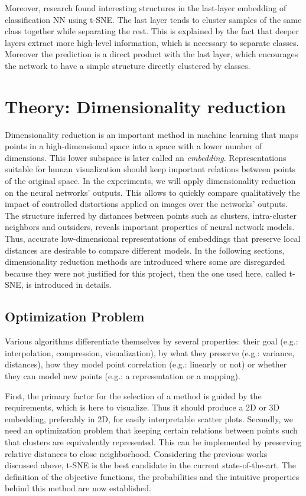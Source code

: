 \documentclass[a4paper,12pt]{report}
\newcommand{\eg}{e.g.}
\begin{document}
Moreover, research found interesting structures in the last-layer embedding of classification NN using t-SNE.
The last layer tends to cluster samples of the same class together while separating the rest\cite{donahue2013decaf}\cite{yu2014visualizing}.
This is explained by the fact that deeper layers extract more high-level information, which is necessary to separate classes. Moreover the prediction is a direct product with the last layer, which encourages the network to have a simple structure directly clustered by classes.


\chapter{Theory: Dimensionality reduction}
\label{chap:dim_red}
Dimensionality reduction is an important method in machine learning that maps points in a high-dimensional space into a space with a lower number of dimensions.
This lower subspace is later called an {\em embedding}.
Representations suitable for human visualization should keep important relations between points of the original space.
In the experiments, we will apply dimensionality reduction on the neural networks' outputs.
This allows to quickly compare qualitatively the impact of controlled distortions applied on images over the networks' outputs.
The structure inferred by distances between points such as clusters, intra-cluster neighbors and outsiders, reveals important properties of neural network models.
Thus, accurate low-dimensional representations of embeddings that preserve local distances are desirable to compare different models.
In the following sections, dimensionality reduction methods are introduced where some are disregarded because they were not justified for this project, then the one used here, called t-SNE, is introduced in details.

\section{Optimization Problem}
Various algorithms differentiate themselves by several properties: their goal (\eg: interpolation, compression, visualization), by what they preserve (\eg: variance, distances), how they model point correlation (\eg: linearly or not) or whether they can model new points (\eg: a representation or a mapping).

First, the primary factor for the selection of a method is guided by the requirements, which is here to visualize.
Thus it should produce a 2D or 3D embedding, preferably in 2D, for easily interpretable scatter plots.
Secondly, we need an optimization problem that keeping certain relations between points such that clusters are equivalently represented.
This can be implemented by preserving relative distances to close neighborhood.
Considering the previous works discussed above, t-SNE is the best candidate in the current state-of-the-art.
The definition of the objective functions, the probabilities and the intuitive properties behind this method are now established.
\end{document}
